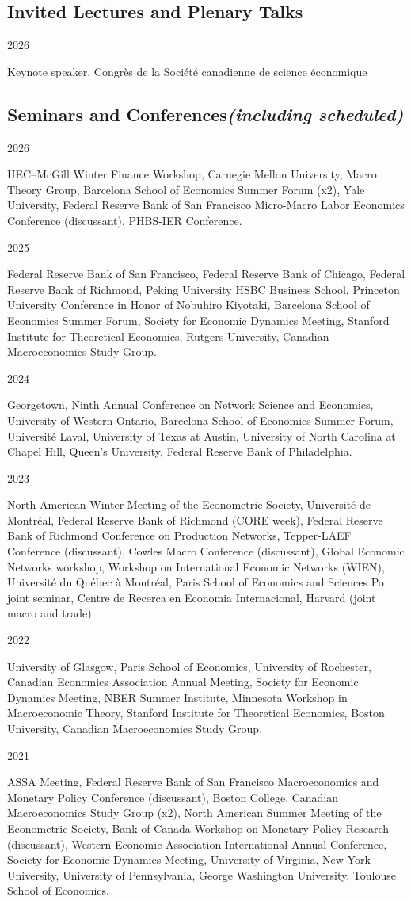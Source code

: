 \documentclass[letterpaper,11pt]{article}
\newcommand{\entry}[2]{\noindent\parbox[t]{0.12\textwidth}{\small #1}\begin{minipage}[t]{0.88\textwidth}#2\end{minipage}\par\vspace{0.7em}}
\begin{document}
\subsection{Invited Lectures and Plenary Talks}
\entry{2026}{Keynote speaker, Congrès de la Société canadienne de science économique}

\subsection{Seminars and Conferences\hfill{\normalfont\small\itshape\color{black!55}(including scheduled)}}
\entry{2026}{HEC--McGill Winter Finance Workshop, Carnegie Mellon University, Macro Theory Group, Barcelona School of Economics Summer Forum (x2), Yale University, Federal Reserve Bank of San Francisco Micro-Macro Labor Economics Conference (discussant), PHBS-IER Conference.}
\entry{2025}{Federal Reserve Bank of San Francisco, Federal Reserve Bank of Chicago, Federal Reserve Bank of Richmond, Peking University HSBC Business School, Princeton University Conference in Honor of Nobuhiro Kiyotaki, Barcelona School of Economics Summer Forum, Society for Economic Dynamics Meeting, Stanford Institute for Theoretical Economics, Rutgers University, Canadian Macroeconomics Study Group.}
\entry{2024}{Georgetown, Ninth Annual Conference on Network Science and Economics, University of Western Ontario, Barcelona School of Economics Summer Forum, Université Laval, University of Texas at Austin, University of North Carolina at Chapel Hill, Queen's University, Federal Reserve Bank of Philadelphia.}
\entry{2023}{North American Winter Meeting of the Econometric Society, Université de Montréal, Federal Reserve Bank of Richmond (CORE week), Federal Reserve Bank of Richmond Conference on Production Networks, Tepper-LAEF Conference (discussant), Cowles Macro Conference (discussant), Global Economic Networks workshop, Workshop on International Economic Networks (WIEN), Université du Québec à Montréal, Paris School of Economics and Sciences Po joint seminar, Centre de Recerca en Economia Internacional, Harvard (joint macro and trade).}
\entry{2022}{University of Glasgow, Paris School of Economics, University of Rochester, Canadian Economics Association Annual Meeting, Society for Economic Dynamics Meeting, NBER Summer Institute, Minnesota Workshop in Macroeconomic Theory, Stanford Institute for Theoretical Economics, Boston University, Canadian Macroeconomics Study Group.}
\entry{2021}{ASSA Meeting, Federal Reserve Bank of San Francisco Macroeconomics and Monetary Policy Conference (discussant), Boston College, Canadian Macroeconomics Study Group (x2), North American Summer Meeting of the Econometric Society, Bank of Canada Workshop on Monetary Policy Research (discussant), Western Economic Association International Annual Conference, Society for Economic Dynamics Meeting, University of Virginia, New York University, University of Pennsylvania, George Washington University, Toulouse School of Economics.}
\end{document}
